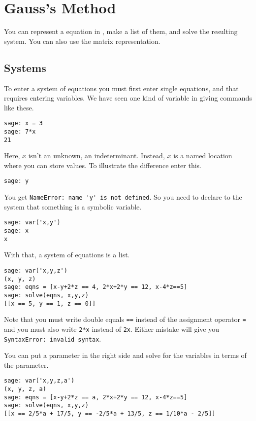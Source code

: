 \chapter{Gauss's Method}

You can represent a equation in \Sage, make a list of them, and
solve the resulting system.
You can also use the matrix representation. 



\section{Systems}
To enter a system of equations you must first enter single equations, and
that requires entering variables.
We have seen one kind of variable in giving \Sage{} commands like these.
\begin{lstlisting}[style=python]
sage: x = 3
sage: 7*x
21  
\end{lstlisting}
Here, $x$ isn't an unknown, an indeterminant.  
Instead, $x$ is a named location where you can store values.
To illustrate the difference enter this.
\begin{lstlisting}[style=python]
sage: y
\end{lstlisting}
You get \lstinline[style=inline]!NameError: name 'y' is not defined!.
So you need to
declare to the system that something is a symbolic variable.
\begin{lstlisting}[style=python]
sage: var('x,y')
sage: x
x
\end{lstlisting}
With that, a system of equations is a list.
\begin{lstlisting}[style=python]
sage: var('x,y,z')                                  
(x, y, z)
sage: eqns = [x-y+2*z == 4, 2*x+2*y == 12, x-4*z==5]
sage: solve(eqns, x,y,z)                            
[[x == 5, y == 1, z == 0]]
\end{lstlisting}
Note that you must write double equals \lstinline[style=inline]!==! instead of 
the assignment operator \lstinline[style=inline]!=! and
you must also write
\lstinline[style=inline]!2*x! instead of  
\lstinline[style=inline]!2x!.
Either mistake will give you  
\lstinline[style=inline]!SyntaxError: invalid syntax!.

You can put a parameter in the right side and solve for the variables
in terms of the parameter.
\begin{lstlisting}[style=python]
sage: var('x,y,z,a')                                
(x, y, z, a)
sage: eqns = [x-y+2*z == a, 2*x+2*y == 12, x-4*z==5]
sage: solve(eqns, x,y,z)  
[[x == 2/5*a + 17/5, y == -2/5*a + 13/5, z == 1/10*a - 2/5]] 
\end{lstlisting}




